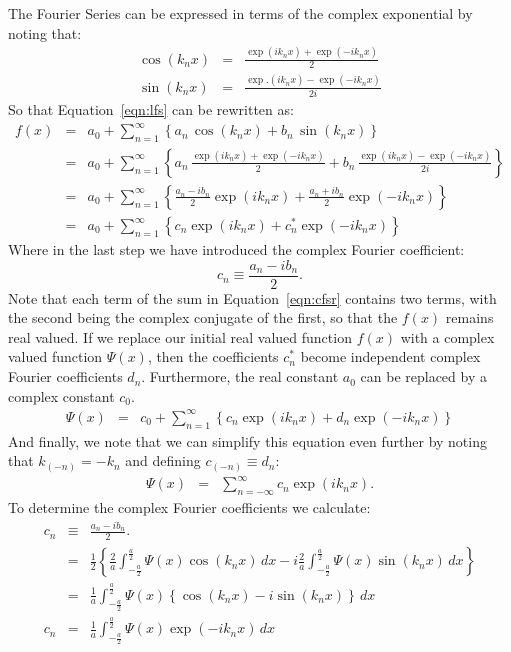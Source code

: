 \documentclass[12pt]{book}
\begin{document}
The Fourier Series can be expressed in terms of the complex exponential by noting that:
\begin{eqnarray*}
\cos(k_n x) &=& \frac{\exp(i k_n x) + \exp(-i k_n x)}{2} \\
\sin(k_n x) &=& \frac{\exp.(i k_n x) - \exp(-i k_n x)}{2i}
\end{eqnarray*}
So that Equation~\ref{eqn:lfs} can be rewritten as:
\begin{eqnarray}
f(x) &=& a_0 + \sum_{n=1}^{\infty}  \left\{ a_n \, \cos(k_n x ) + b_n \, \sin( k_n x ) \right\} \nonumber \\
&=& a_0 + \sum_{n=1}^{\infty}  \left\{ a_n \,  \frac{\exp(i k_n x) + \exp(-i k_n x)}{2} 
+ b_n \, \frac{\exp(i k_n x) - \exp(-i k_n x)}{2i} \right\} \nonumber \\
&=& a_0 + \sum_{n=1}^{\infty}  \left\{ \frac{a_n - i b_n}{2} \exp(i k_n x) + 
\frac{a_n + i b_n}{2} \exp(-i k_n x) \right\} \nonumber \\
&=& a_0 + \sum_{n=1}^{\infty}  \left\{ c_n \exp(i k_n x) + 
c_n^* \exp(-i k_n x) \right\} \label{eqn:cfsr} \label{eqn:cfsr} 
\end{eqnarray}
Where in the last step we have introduced the complex Fourier coefficient:
\begin{displaymath}
c_n \equiv \frac{a_n - i b_n}{2}.
\end{displaymath}
Note that each term of the sum in Equation~\ref{eqn:cfsr} contains two terms, with the second being the complex conjugate of the first, so that the $f(x)$ remains real valued.  If we replace our initial real valued function $f(x) $ with a complex valued function $\Psi(x)$, then the coefficients $c_n^*$ become independent complex Fourier coefficients $d_n$.  Furthermore, the real constant $a_0$ can be replaced by a complex constant $c_0$.  
\begin{eqnarray*}
\Psi(x)  &=& c_0 + \sum_{n=1}^{\infty}  \left\{ c_n \exp(i k_n x) + 
d_n \exp(-i k_n x) \right\} \label{eqn:cfsr} \label{eqn:cfsr} 
\end{eqnarray*}
And finally, we note that we can simplify this equation even further by noting that 
$k_{(-n)} = -k_n$ and defining $c_{(-n)} \equiv d_n$:
\begin{eqnarray}
\Psi(x) &=& \sum_{n=-\infty}^{\infty} c_n \exp(i k_n x). \label{eqn:cfs}
\end{eqnarray}
To determine the complex Fourier coefficients we calculate:
\begin{eqnarray}
c_n &\equiv& \frac{a_n - i b_n}{2}. \nonumber \\
&=& \frac{1}{2} \left\{ 
\frac{2}{a} \int_{-\frac{a}{2}}^{\frac{a}{2}}  \Psi(x) \cos( k_n x) \, dx
-i \frac{2}{a} \int_{-\frac{a}{2}}^{\frac{a}{2}}  \Psi(x) \sin( k_n x) \, dx
\right\} \nonumber \\
&=& \frac{1}{a} \int_{-\frac{a}{2}}^{\frac{a}{2}}  \Psi(x) \left\{\cos( k_n x) - i \sin( k_n x) \right\} \, dx \nonumber \\
c_n &=& \frac{1}{a} \int_{-\frac{a}{2}}^{\frac{a}{2}}  \Psi(x) \exp(-i k_n x) \, dx \label{eqn:cfc}
\end{eqnarray}
\end{document}
